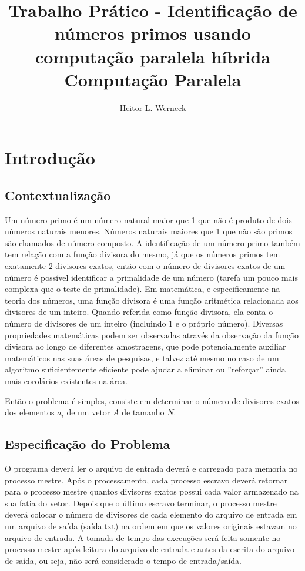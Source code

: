\documentclass[12pt]{article}
\title{Trabalho Prático - Identificação de números primos usando computação paralela híbrida \\
	\large Computação Paralela}
\author{Heitor L. Werneck}
\begin{document}
\maketitle

\section{Introdução}
\subsection{Contextualização}

Um número primo é um número natural maior que 1 que não é produto de dois números naturais menores. Números naturais maiores que 1 que não são primos são chamados de número composto. A identificação de um número primo também tem relação com a função divisora do mesmo, já que os números primos tem exatamente 2 divisores exatos, então com o número de divisores exatos de um número é possível identificar a primalidade de um número (tarefa um pouco mais complexa que o teste de primalidade). Em matemática, e especificamente na teoria dos números, uma função divisora é uma função aritmética relacionada aos divisores de um inteiro. Quando referida como função divisora, ela conta o número de divisores de um inteiro (incluindo 1 e o próprio número). Diversas propriedades matemáticas podem ser observadas através da observação da função divisora ao longo de diferentes amostragens, que pode potencialmente auxiliar matemáticos nas suas áreas de pesquisas, e talvez até mesmo no caso de um algoritmo suficientemente eficiente pode ajudar a eliminar ou ''reforçar'' ainda mais corolários existentes na área.

Então o problema é simples, consiste em determinar o número de divisores exatos dos elementos $a_i$ de um vetor $A$ de tamanho $N$.


\subsection{Especificação do Problema}

O programa deverá ler o arquivo de entrada deverá e carregado para memoria no processo mestre. Após o processamento, cada processo escravo deverá retornar para o processo mestre quantos divisores exatos possui cada valor armazenado na sua fatia do vetor. Depois que o último escravo terminar, o processo mestre deverá colocar o número de divisores de cada elemento do arquivo de entrada em um arquivo de saída (saída.txt) na ordem em que os valores originais estavam no arquivo de entrada. A tomada de tempo das execuções será feita somente no processo mestre após leitura do arquivo de entrada e antes da escrita do arquivo de saída, ou seja, não será considerado o tempo de entrada/saída.
\end{document}
